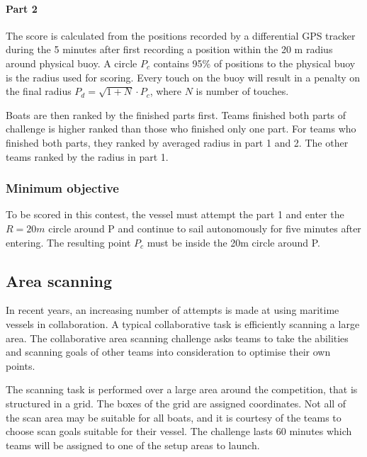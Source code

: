 \documentclass[12pt]{article}
\begin{document}
\paragraph{Part 2}
The score is calculated from the positions recorded by a differential GPS tracker during the 5
minutes after first recording a position within the 20 m radius around physical buoy.
A circle $P_c$ contains 95\% of positions to the physical buoy is the radius used for scoring.
Every touch on the buoy will result in a penalty on the final radius $P_d = \sqrt{1+N}\cdot P_c$,
where $N$ is number of touches. 

Boats are then ranked by the finished parts first. 
Teams finished both parts of challenge is higher ranked than those who finished only one part.
For teams who finished both parts, they ranked by averaged radius in part 1 and 2.
The other teams ranked by the radius in part 1.


\subsubsection{Minimum objective}
To be scored in this contest, the vessel must attempt the part 1 and enter the $R=20m$ circle around P
and continue to sail autonomously for five minutes after entering. The resulting 
point $P_c$ must be inside the 20m circle around P.

\subsection{Area scanning}
In recent years, an increasing number of attempts is made at using maritime
vessels in collaboration. A typical
collaborative task is efficiently scanning a large area.
The collaborative area scanning challenge asks teams to take the abilities and
scanning goals of other teams into consideration to optimise their own points.

The scanning task is performed over a large area around the competition, that is
structured in a grid. The boxes of the grid are assigned coordinates. Not all of
the scan area may be suitable for all boats, and it is courtesy of the teams to
choose scan goals suitable for their vessel. The
challenge lasts 60 minutes which teams will be assigned to one of the setup areas
to launch. 
\end{document}
